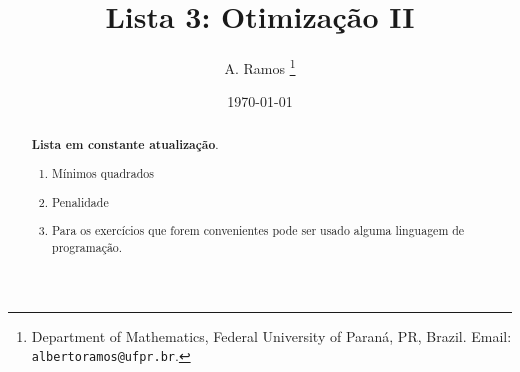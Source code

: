 \documentclass[a4paper,latin]{article}
\begin{document}
\title{Lista 3: Otimização II }
 
\author{
A. Ramos \thanks{Department of Mathematics,
    Federal University of Paraná, PR, Brazil.
    Email: {\tt albertoramos@ufpr.br}.}
}

\date{\today}
 
\maketitle

\begin{abstract}
{\bf Lista em constante atualização}.
 \begin{enumerate}
 \item Mínimos quadrados
 \item Penalidade
 \item Para os exercícios que forem convenientes pode ser usado alguma linguagem  de programação.  
 \end{enumerate}
\end{abstract}

       
\end{document}
